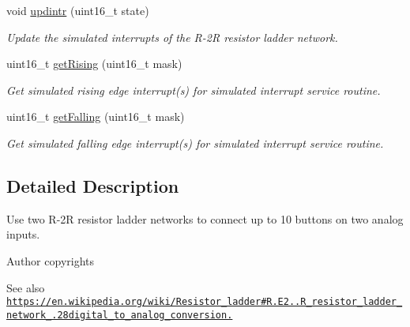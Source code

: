 \begin{DoxyCompactItemize}
void \hyperlink{group__buttons_ga66c6a02c014dc9acd3af0c816a70fad8}{updintr} (uint16\+\_\+t state)
\begin{DoxyCompactList}\small\item\em Update the simulated interrupts of the R-\/2R resistor ladder network. \end{DoxyCompactList}\item 
uint16\+\_\+t \hyperlink{group__buttons_ga9b1decfe9116af4b8853a02aebfa1d14}{get\+Rising} (uint16\+\_\+t mask)
\begin{DoxyCompactList}\small\item\em Get simulated rising edge interrupt(s) for simulated interrupt service routine. \end{DoxyCompactList}\item 
uint16\+\_\+t \hyperlink{group__buttons_ga2971d62e0d7420f71836fb86e0fce92f}{get\+Falling} (uint16\+\_\+t mask)
\begin{DoxyCompactList}\small\item\em Get simulated falling edge interrupt(s) for simulated interrupt service routine. \end{DoxyCompactList}\end{DoxyCompactItemize}


\subsection{Detailed Description}
Use two R-\/2R resistor ladder networks to connect up to 10 buttons on two analog inputs. 

\begin{DoxyAuthor}{Author}
copyrights
\end{DoxyAuthor}
\begin{DoxySeeAlso}{See also}
\href{https://en.wikipedia.org/wiki/Resistor_ladder#R.E2.80.932R_resistor_ladder_network_.28digital_to_analog_conversion.29}{\tt https\+://en.\+wikipedia.\+org/wiki/\+Resistor\+\_\+ladder\#\+R.\+E2..\+R\+\_\+resistor\+\_\+ladder\+\_\+network\+\_\+.\+28digital\+\_\+to\+\_\+analog\+\_\+conversion.} 
\end{DoxySeeAlso}
